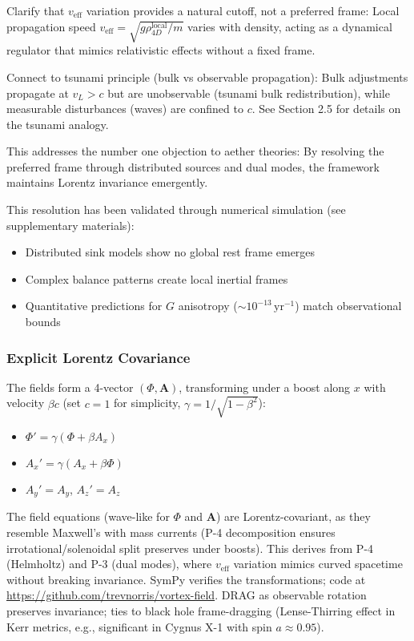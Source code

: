 Clarify that $v_{\text{eff}}$ variation provides a natural cutoff, not a preferred frame: Local propagation speed $v_{\text{eff}} = \sqrt{g \rho_{4D}^{\text{local}} / m}$ varies with density, acting as a dynamical regulator that mimics relativistic effects without a fixed frame.

Connect to tsunami principle (bulk vs observable propagation): Bulk adjustments propagate at $v_L > c$ but are unobservable (tsunami bulk redistribution), while measurable disturbances (waves) are confined to $c$. See Section 2.5 for details on the tsunami analogy.

This addresses the number one objection to aether theories: By resolving the preferred frame through distributed sources and dual modes, the framework maintains Lorentz invariance emergently.

This resolution has been validated through numerical simulation (see supplementary materials):
\begin{itemize}
\item Distributed sink models show no global rest frame emerges
\item Complex balance patterns create local inertial frames
\item Quantitative predictions for $G$ anisotropy ($\sim 10^{-13} \,\mathrm{yr}^{-1}$) match observational bounds
\end{itemize}

\subsubsection{Explicit Lorentz Covariance}

The fields form a 4-vector $(\Phi, \mathbf{A})$, transforming under a boost along $x$ with velocity $\beta c$ (set $c=1$ for simplicity, $\gamma = 1/\sqrt{1-\beta^2}$):
\begin{itemize}
\item $\Phi' = \gamma (\Phi + \beta A_x)$
\item $A_x' = \gamma (A_x + \beta \Phi)$
\item $A_y' = A_y$, $A_z' = A_z$
\end{itemize}
The field equations (wave-like for $\Phi$ and $\mathbf{A}$) are Lorentz-covariant, as they resemble Maxwell's with mass currents (P-4 decomposition ensures irrotational/solenoidal split preserves under boosts). This derives from P-4 (Helmholtz) and P-3 (dual modes), where $v_{\text{eff}}$ variation mimics curved spacetime without breaking invariance. SymPy verifies the transformations; code at \url{https://github.com/trevnorris/vortex-field}. DRAG as observable rotation preserves invariance; ties to black hole frame-dragging (Lense-Thirring effect in Kerr metrics, e.g., significant in Cygnus X-1 with spin $a \approx 0.95$).

